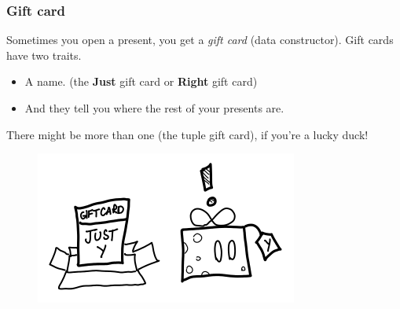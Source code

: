 \documentclass{beamer}
\begin{document}

\begin{frame}
\frametitle{Gift card}
Sometimes you open a present, you get a \textit{gift card} (data constructor).\newline
Gift cards have two traits.\newline
\begin{itemize}
    \item A name. (the \textbf{Just} gift card or \textbf{Right} gift card)\newline
    \item And they tell you where the rest of your presents are.\newline
\end{itemize}
There might be more than one (the tuple gift card), if you’re a lucky duck!
\begin{figure}[hbt!]
    \centering
    \includegraphics[height=0.4\textheight]{./pic/thunk-constructor.png}
\end{figure}
\end{frame}

\end{document}
